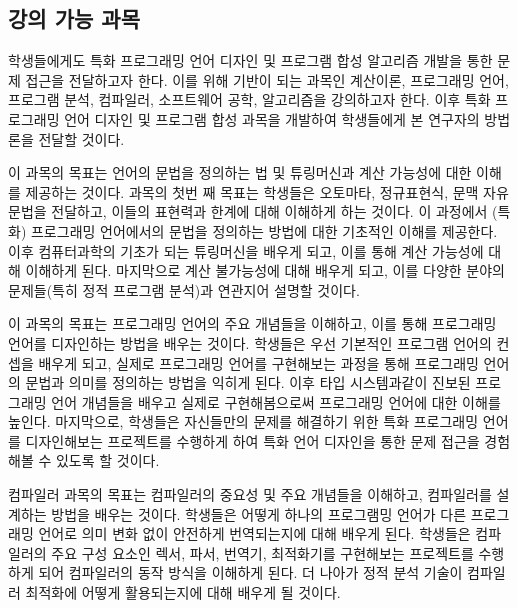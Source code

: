 \documentclass[11pt]{article}
\newcommand{\myparagraph}[1]{\medskip\noindent{\it \textbf{#1.}}}
\begin{document}
\begin{spacing}{1.145}
\section{강의 가능 과목}
학생들에게도 특화 프로그래밍 언어 디자인 및 프로그램 합성 알고리즘 개발을 통한 문제 접근을 전달하고자 한다.
%
이를 위해 기반이 되는 과목인 계산이론, 프로그래밍 언어, 프로그램 분석, 컴파일러, 소프트웨어 공학, 알고리즘을 강의하고자 한다.
%
이후 특화 프로그래밍 언어 디자인 및 프로그램 합성 과목을 개발하여 학생들에게 본 연구자의 방법론을 전달할 것이다.



\myparagraph{계산이론} 
%
이 과목의 목표는 언어의 문법을 정의하는 법 및 튜링머신과 계산 가능성에 대한 이해를 제공하는 것이다. 
%
과목의 첫번 째 목표는 학생들은 오토마타, 정규표현식, 문맥 자유 문법을 전달하고, 이들의 표현력과 한계에 대해 이해하게 하는 것이다.
%
이 과정에서 (특화) 프로그래밍 언어에서의 문법을 정의하는 방법에 대한 기초적인 이해를 제공한다.
%
이후 컴퓨터과학의 기초가 되는 튜링머신을 배우게 되고, 이를 통해 계산 가능성에 대해 이해하게 된다.
%
마지막으로 계산 불가능성에 대해 배우게 되고, 이를 다양한 분야의 문제들(특히 정적 프로그램 분석)과 연관지어 설명할 것이다.



\myparagraph{프로그래밍 언어}
%
이 과목의 목표는 프로그래밍 언어의 주요 개념들을 이해하고, 이를 통해 프로그래밍 언어를 디자인하는 방법을 배우는 것이다.
%
학생들은 우선 기본적인 프로그램 언어의 컨셉을 배우게 되고, 실제로 프로그래밍 언어를 구현해보는 과정을 통해 프로그래밍 언어의 문법과 의미를 정의하는 방법을 익히게 된다.
%
이후 타입 시스템과같이 진보된 프로그래밍 언어 개념들을 배우고 실제로 구현해봄으로써 프로그래밍 언어에 대한 이해를 높인다.
%
마지막으로, 학생들은 자신들만의 문제를 해결하기 위한 특화 프로그래밍 언어를 디자인해보는 프로젝트를 수행하게 하여 특화 언어 디자인을 통한 문제 접근을 경험해볼 수 있도록 할 것이다.






\myparagraph{컴파일러}
%
컴파일러 과목의 목표는 컴파일러의 중요성 및 주요 개념들을 이해하고, 컴파일러를 설계하는 방법을 배우는 것이다.
%
학생들은 어떻게 하나의 프로그램밍 언어가 다른 프로그래밍 언어로 의미 변화 없이 안전하게 번역되는지에 대해 배우게 된다.
%
학생들은 컴파일러의 주요 구성 요소인 렉서, 파서, 번역기, 최적화기를 구현해보는 프로젝트를 수행하게 되어 컴파일러의 동작 방식을 이해하게 된다.
%
더 나아가 정적 분석 기술이 컴파일러 최적화에 어떻게 활용되는지에 대해 배우게 될 것이다.




\end{spacing}
\end{document}
